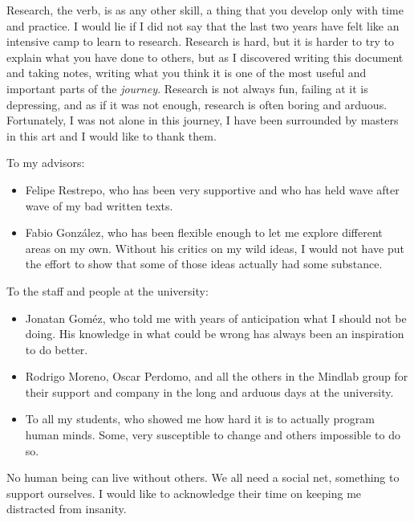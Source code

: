 \begin{acknowledgements}
\addchaptertocentry{\acknowledgementname} %

Research, the verb, is as any other skill, a thing that you develop only with time and
practice. I would lie if I did not say that the last two years have felt like an intensive
camp to learn to research. Research is hard, but it is harder to try to explain what you
have done to others, but as I discovered writing this document and taking notes, writing
what you think it is one of the most useful and important parts of the \textit{journey}.
Research is not always fun, failing at it is depressing, and as if it was not enough,
research is often boring and arduous. Fortunately, I was not alone in this journey, I have
been surrounded by masters in this art and I would like to thank them.

To my advisors:

\begin{itemize}
\tightlist
\item Felipe Restrepo, who has been very supportive and who has held wave after wave of my
  bad written texts.
\item Fabio González, who has been flexible enough to let me explore different areas on my
  own. Without his critics on my wild ideas, I would not have put the effort to show that
  some of those ideas actually had some substance.
\end{itemize}

To the staff and people at the university:

\begin{itemize}
\tightlist
\item Jonatan Goméz, who told me with years of anticipation what I should not be doing.
  His knowledge in what could be wrong has always been an inspiration to do better.
\item Rodrigo Moreno, Oscar Perdomo, and all the others in the Mindlab group for their
  support and company in the long and arduous days at the university.
\item To all my students, who showed me how hard it is to actually program human minds.
  Some, very susceptible to change and others impossible to do so.
\end{itemize}

No human being can live without others. We all need a social net, something to support
ourselves. I would like to acknowledge their time on keeping me distracted from insanity.


\end{acknowledgements}
